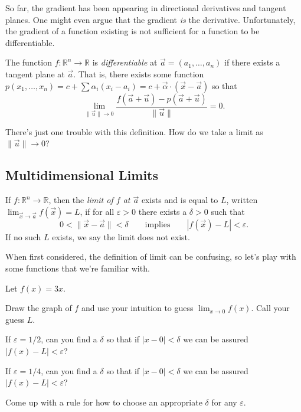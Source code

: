 \documentclass{problemset}
\newcommand{\R}{\mathbb{R}}
\begin{document}
	So far, the gradient has been appearing in directional derivatives and tangent planes.
	One might even argue that the gradient \emph{is} the derivative.  Unfortunately, the gradient
	of a function existing is not sufficient for a function to be differentiable.

	\begin{definition}[Differentiable]
		The function $f:\R^n\to \R$ is \emph{differentiable} at $\vec a=(a_1,\ldots,a_n)$ if there exists
		a tangent plane at $\vec a$.  That is, there exists some function $p(x_1,\ldots, x_n)
		= c+\sum \alpha_i (x_i-a_i) = c+\vec \alpha \cdot(\vec x-\vec a)$ so that
		\[
			\lim_{\|\vec u\|\to0} \frac{f(\vec a + \vec u)-p(\vec a + \vec u)}{\|\vec u\|} = 0.
		\]
	\end{definition}

	There's just one trouble with this definition.  How do we take a limit as $\|\vec u\|\to 0$?

\newpage
\subsection*{Multidimensional Limits}

	\begin{definition}[Limit]
		If $f:\R^n\to \R$, then the \emph{limit of $f$ at $\vec a$} exists and is equal to $L$, written
		$\displaystyle \lim_{\vec x\to\vec a} f(\vec x) = L$, if
		for all $\varepsilon > 0$ there exists a $\delta > 0$ such that
		\[
			0<\|\vec x-\vec a\| <\delta \qquad \text{implies}\qquad |f(\vec x) - L| < \varepsilon.
		\]
		If no such $L$ exists, we say the limit does not exist.
	\end{definition}
	When first considered, the definition of limit can be confusing, so let's play with some functions
	that we're familiar with.

	\question
	Let $f(x) = 3x$.
	\begin{parts}
		\item  Draw the graph of $f$ and use your intuition to guess $\lim_{x\to 0} f(x)$.  Call your
			guess $L$.
		\item If $\varepsilon = 1/2$, can you find a $\delta$ so that if $|x-0|<\delta$ we can be assured
			$|f(x)-L|<\varepsilon$?
		\item If $\varepsilon = 1/4$, can you find a $\delta$ so that if $|x-0|<\delta$ we can be assured
			$|f(x)-L|<\varepsilon$?
		\item Come up with a rule for how to choose an appropriate $\delta$ for any $\varepsilon$.
	\end{parts}
\end{document}
